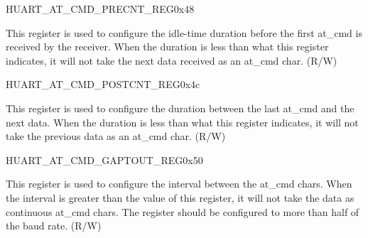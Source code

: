 \begin{register}{H}{UART\_AT\_CMD\_PRECNT\_REG}{0x48}\label{regdesc:UARTATCMDPRECNTREG}
%
%
\regnewline%
\begin{regdesc}\begin{reglist}
\item [UART\_PRE\_IDLE\_NUM]This register is used to configure the idle-time duration before the first at\_cmd is received by the receiver. When the duration is less than what this register indicates, it will not take the next data received as an at\_cmd char. (R/W)
\end{reglist}\end{regdesc}
\end{register}


\begin{register}{H}{UART\_AT\_CMD\_POSTCNT\_REG}{0x4c}\label{regdesc:UARTATCMDPOSTCNTREG}
%
%
\regnewline%
\begin{regdesc}\begin{reglist}
\item [UART\_POST\_IDLE\_NUM]This register is used to configure the duration between the last at\_cmd and the next data. When the duration is less than what this register indicates, it will not take the previous data as an at\_cmd char. (R/W)
\end{reglist}\end{regdesc}
\end{register}


\begin{register}{H}{UART\_AT\_CMD\_GAPTOUT\_REG}{0x50}\label{regdesc:UARTATCMDGAPTOUTREG}
%
%
\regnewline%
\begin{regdesc}\begin{reglist}
\item [UART\_RX\_GAP\_TOUT]\label{UARTRXGAPTOUT} This register is used to configure the interval between the at\_cmd chars. When the interval is greater than the value of this register, it will not take the data as continuous at\_cmd chars. The register should be configured to more than half of the baud rate. (R/W)
\end{reglist}\end{regdesc}
\end{register}


